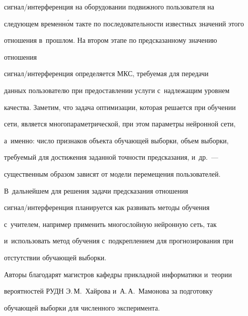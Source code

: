 сиг\-нал\!/\!ин\-тер\-фе\-рен\-ция на оборудовании подвижного пользователя на 


следующем временн\'{о}м такте по последовательности известных значений этого 


отношения в~прошлом. На втором этапе по предсказанному значению 


отношения  


сиг\-нал\!/\!ин\-тер\-фе\-рен\-ция определяется МКС, требуемая для передачи 


данных пользователю при предоставлении услуги с~надлежащим уровнем 


качества. Заметим, что задача оптимизации, которая решается при обучении 


сети, является многопараметрической, при этом параметры нейронной сети, 


а~именно: число признаков объекта обучающей выборки, объем выборки, 


требуемый для достижения заданной точности предсказания, и~др.~--- 


существенным образом зависят от модели перемещения пользователей. 


В~дальнейшем для решения задачи предсказания отношения  


сиг\-нал\!/\!ин\-тер\-фе\-рен\-ция планируется как развивать методы обучения 


с~учителем, например применить многослойную нейронную сеть, так 


и~использовать метод обучения с~подкреплением для прогнозирования при 


отстутствии обучающей выборки.


  


  \bigskip


  Авторы благодарят магистров кафедры прикладной информатики и~теории 


вероятностей РУДН Э.\,М.~Хайрова и~А.\,А.~Мамонова за подготовку 


обучающей выборки для численного эксперимента.


  


